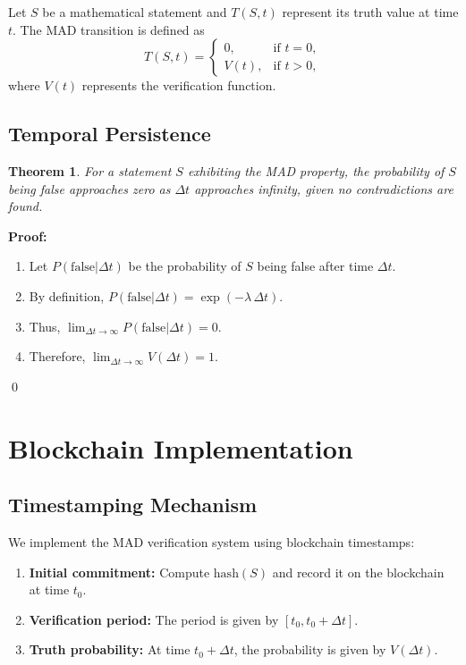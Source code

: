 \documentclass[11pt]{article}
\newtheorem{theorem}{Theorem}[section]
\begin{document}
Let $S$ be a mathematical statement and $T(S,t)$ represent its truth value at time $t$. The MAD transition is defined as
\[
T(S,t) = \begin{cases}
0, & \text{if } t = 0, \\
V(t), & \text{if } t > 0,
\end{cases}
\]
where $V(t)$ represents the verification function.

\subsection{Temporal Persistence}

\begin{theorem}
For a statement $S$ exhibiting the MAD property, the probability of $S$ being false approaches zero as $\Delta t$ approaches infinity, given no contradictions are found.
\end{theorem}

\noindent\textbf{Proof:} 
\begin{enumerate}[label=(\roman*)]
    \item Let $P(\text{false}|\Delta t)$ be the probability of $S$ being false after time $\Delta t$.
    \item By definition, $P(\text{false}|\Delta t)=\exp(-\lambda\,\Delta t)$.
    \item Thus, $\displaystyle \lim_{\Delta t \to \infty}P(\text{false}|\Delta t) = 0$.
    \item Therefore, $\displaystyle \lim_{\Delta t \to \infty} V(\Delta t) = 1$.
\end{enumerate}
\qed

\section{Blockchain Implementation}

\subsection{Timestamping Mechanism}

We implement the MAD verification system using blockchain timestamps:
\begin{enumerate}[label=(\arabic*)]
    \item \textbf{Initial commitment:} Compute $\mathrm{hash}(S)$ and record it on the blockchain at time $t_0$.
    \item \textbf{Verification period:} The period is given by $[t_0, t_0+\Delta t]$.
    \item \textbf{Truth probability:} At time $t_0+\Delta t$, the probability is given by $V(\Delta t)$.
\end{enumerate}
\end{document}
